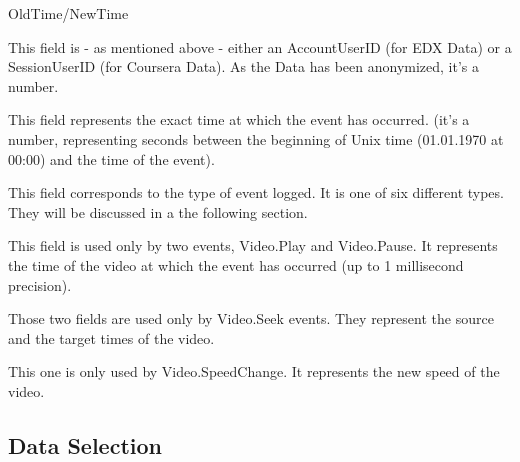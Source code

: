 \documentclass[11pt,a4paper]{article}
\begin{document}
\begin{labeling}{OldTime/NewTime}
    \item [UserID] This field is - as mentioned above - either an AccountUserID (for EDX Data) or a SessionUserID (for Coursera Data). As the Data has been anonymized, it's a number.
    \item [TimeStamp] This field represents the exact time at which the event has occurred. (it's a number, representing seconds between the beginning of Unix time (01.01.1970 at 00:00) and the time of the event).
    \item [EventType] This field corresponds to the type of event logged. It is one of six different types. They will be discussed in a the following section.
    \item [CurrentTime] This field is used only by two events, Video.Play and Video.Pause. It represents the time of the video at which the event has occurred (up to 1 millisecond precision).
    \item [OldTime/NewTime] Those two fields are used only by Video.Seek events. They represent the source and the target times of the video.
    \item [NewSpeed] This one is only used by Video.SpeedChange. It represents the new speed of the video.
\end{labeling}

\subsection{Data Selection}
\end{document}
